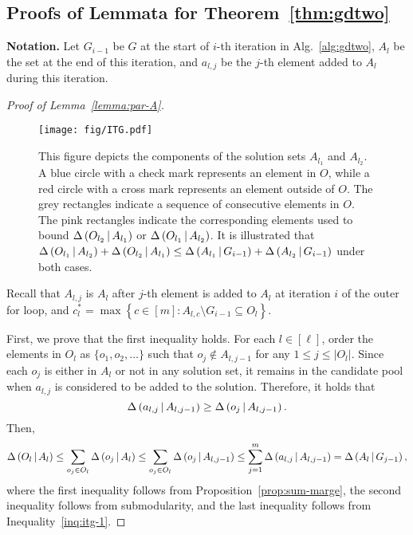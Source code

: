 \subsection{Proofs of Lemmata for Theorem~\ref{thm:gdtwo}} \label{apx:gdtwo-lemma}
\textbf{Notation.} 
Let $G_{i-1}$ be $G$ at the start of $i$-th iteration in Alg.~\ref{alg:gdtwo},
$A_l$ be the set at the end of this iteration,
and $a_{l, j}$ be the $j$-th element added to $A_l$ during this iteration.

\lemmaparA*
\begin{proof}[Proof of Lemma~\ref{lemma:par-A}]
\begin{figure}
\centering
\texttt{[image: fig/ITG.pdf]}
\caption{This figure depicts the components of the solution sets $A_{l_1}$ and $A_{l_2}$.
A blue circle with a check mark represents an element in $O$,
while a red circle with a cross mark represents an element outside of $O$.
The grey rectangles indicate a sequence of consecutive elements in $O$.
The pink rectangles indicate the corresponding elements used to bound $\Delta \left( O_{l_2} \, \middle| \, A_{l_1} \right)$ or $\Delta \left( O_{l_1} \, \middle| \, A_{l_2} \right)$.
It is illustrated that $\Delta \left( O_{l_1} \, \middle| \, A_{l_2} \right) + \Delta \left( O_{l_2} \, \middle| \, A_{l_1} \right)\le \Delta \left( A_{l_1} \, \middle| \, G_{i-1} \right) +  \Delta \left( A_{l_2} \, \middle| \, G_{i-1} \right)$ under both cases.}
\label{fig:gdtwo}
\end{figure}
Recall that $A_{l, j}$ is $A_l$ after $j$-th element is added to $A_l$ at iteration $i$ of the outer for loop,
and $c_l^* = \max\left\{c\in [m]: A_{l, c}\setminus G_{i-1}\subseteq O_l \right\}$.

First, we prove that the first inequality holds.
For each $l\in [\ell]$, order the elements in $O_l$ as $\{o_1, o_2, \ldots\}$
such that $o_j \not \in A_{l, j-1}$ for any $1\le j \le |O_l|$.
Since each $o_j$ is either in $A_l$ or not in any solution set,
it remains in the candidate pool when $a_{l, j}$ is considered to be added to the solution.
Therefore, it holds that
\begin{equation}\label{inq:itg-1}
\Delta \left( a_{l, j} \, \middle| \, A_{l, j-1} \right)\ge \Delta \left( o_j \, \middle| \, A_{l, j-1} \right).
\end{equation}
Then,
\begin{align*}
\Delta \left( O_{l} \, \middle| \, A_{l} \right) \le \sum_{o_j\in O_l} \Delta \left( o_j \, \middle| \, A_{l} \right) \le \sum_{o_j\in O_l} \Delta \left( o_j \, \middle| \, A_{l, j-1} \right)\le \sum_{j=1}^{m}\Delta \left( a_{l, j} \, \middle| \, A_{l, j-1} \right) = \Delta \left( A_{l} \, \middle| \, G_{j-1} \right),
\end{align*}
where the first inequality follows from Proposition~\ref{prop:sum-marge},
the second inequality follows from submodularity,
and the last inequality follows from Inequality~\eqref{inq:itg-1}.


\end{proof}
